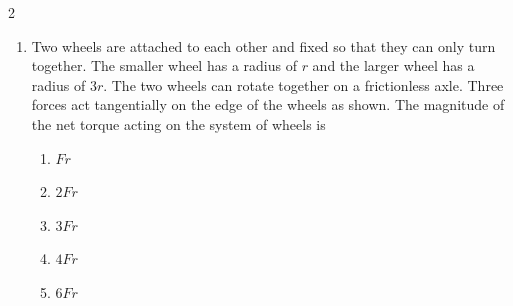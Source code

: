 {\begin{multicols}{2}
\begin{enumerate}[leftmargin=12pt,itemsep=6pt]
%    
  
    \item Two wheels are attached to each other and fixed so that they can only
      turn together. The smaller wheel has a radius of $r$ and the larger wheel
      has a radius of $3r$. The two wheels can rotate together on a frictionless
      axle. Three forces act tangentially on the edge of the wheels as shown.
      The magnitude of the net torque acting on the system of wheels is
      \begin{center}
      \end{center}
      \begin{enumerate}
      \item $Fr$
      \item $2Fr$
      \item $3Fr$
      \item $4Fr$
      \item $6Fr$
      \end{enumerate}
    \end{enumerate}
  \end{multicols}
}

